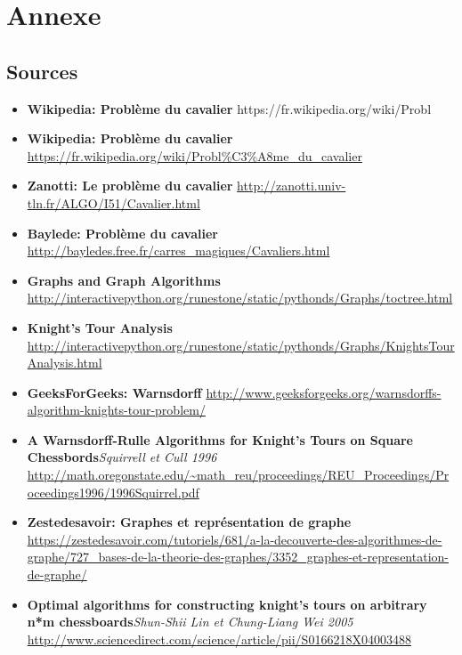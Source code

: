 \section{Annexe}

\subsection{Sources}
\begin{itemize}
  \item \textbf{Wikipedia: Problème du cavalier} https://fr.wikipedia.org/wiki/Probl%
    \item \textbf{Wikipedia: Problème du cavalier} \url{https://fr.wikipedia.org/wiki/Probl%C3%A8me_du_cavalier}
	\item \textbf{Zanotti: Le problème du cavalier} \url{http://zanotti.univ-tln.fr/ALGO/I51/Cavalier.html}
	\item \textbf{Baylede: Problème du cavalier} \url{http://bayledes.free.fr/carres_magiques/Cavaliers.html}
	\item \textbf{Graphs and Graph Algorithms} \url{http://interactivepython.org/runestone/static/pythonds/Graphs/toctree.html}
	\item \textbf{Knight’s Tour Analysis} \url{http://interactivepython.org/runestone/static/pythonds/Graphs/KnightsTourAnalysis.html}
	\item \textbf{GeeksForGeeks: Warnsdorff} \url{http://www.geeksforgeeks.org/warnsdorffs-algorithm-knights-tour-problem/}
	\item \textbf{A Warnsdorff-Rulle Algorithms for Knight’s Tours on Square Chessbords}\textit{Squirrell et Cull 1996} \url{http://math.oregonstate.edu/~math_reu/proceedings/REU_Proceedings/Proceedings1996/1996Squirrel.pdf}
	\item \textbf{Zestedesavoir: Graphes et représentation de graphe} \url{https://zestedesavoir.com/tutoriels/681/a-la-decouverte-des-algorithmes-de-graphe/727_bases-de-la-theorie-des-graphes/3352_graphes-et-representation-de-graphe/}
	\item \textbf{Optimal algorithms for constructing knight's tours on arbitrary n*m chessboards}\textit{Shun-Shii Lin et Chung-Liang Wei 2005} \url{http://www.sciencedirect.com/science/article/pii/S0166218X04003488}

\end{itemize}
